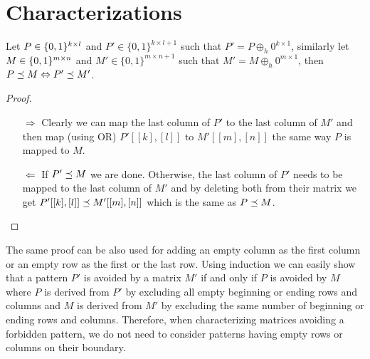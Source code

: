 \newsavebox{\smlmat}
\newsavebox{\smlmatb}
\newsavebox{\smlmatc}

\section{Characterizations}
\begin{obs}
Let $P\in\{0,1\}^{k\times l}$ and $P'\in\{0,1\}^{k\times l+1}$ such that $P'=P\oplus_h0^{k\times1}$, similarly let $M\in\{0,1\}^{m\times n}$ and $M'\in\{0,1\}^{m\times n+1}$ such that $M'=M\oplus_h0^{m\times1}$, then $P\preceq M\Leftrightarrow P'\preceq M'$.
\end{obs}
\begin{proof}
\begin{itemize}
\item[$\Rightarrow$] Clearly we can map the last column of $P'$ to the last column of $M'$ and then map (using OR) $P'[[k],[l]]$ to $M'[[m],[n]]$ the same way $P$ is mapped to $M$.
\item[$\Leftarrow$] If $P'\preceq M$ we are done. Otherwise, the last column of $P'$ needs to be mapped to the last column of $M'$ and by deleting both from their matrix we get $P'[[k],[l]]\preceq M'[[m],[n]]$ which is the same as $P\preceq M$.
\end{itemize}
\end{proof}

The same proof can be also used for adding an empty column as the first column or an empty row as the first or the last row. Using induction we can easily show that a pattern $P'$ is avoided by a matrix $M'$ if and only if $P$ is avoided by $M$ where $P$ is derived from $P'$ by excluding all empty beginning or ending rows and columns and $M$ is derived from $M'$ by excluding the same number of beginning or ending rows and columns. Therefore, when characterizing matrices avoiding a forbidden pattern, we do not need to consider patterns having empty rows or columns on their boundary.

